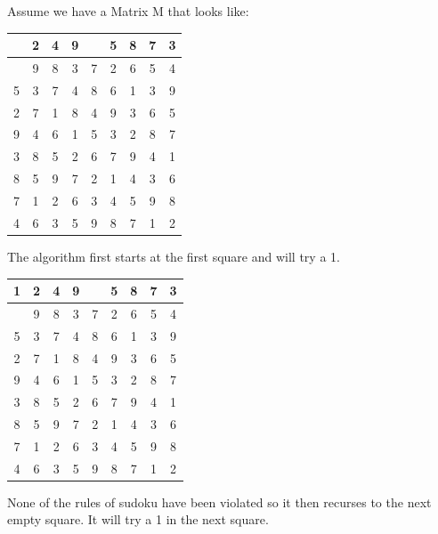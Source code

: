 \documentclass{sig-alternate}
\begin{document}
Assume we have a Matrix M that looks like:

\begin{center}
  \begin{tabular}{ | c | c | c | c | c | c | c | c | c |}
    \hline
      & 2 & 4 & 9 &  & 5 & 8 & 7 & 3 \\ \hline
	  & 9 & 8 & 3 & 7 & 2 & 6 & 5 & 4 \\ \hline
	 5 & 3 & 7 & 4 & 8 & 6 & 1 & 3 & 9\\ \hline
	 2 & 7 & 1 & 8 & 4 & 9 & 3 & 6 & 5\\ \hline
	 9 & 4 & 6 & 1 & 5 & 3 & 2 & 8 & 7\\ \hline
	 3 & 8 & 5 & 2 & 6 & 7 & 9 & 4 & 1\\ \hline
     8 & 5 & 9 & 7 & 2 & 1 & 4 & 3 & 6\\ \hline
	 7 & 1 & 2 & 6 & 3 & 4 & 5 & 9 & 8\\ \hline
	 4 & 6 & 3 & 5 & 9 & 8 & 7 & 1 & 2\\ \hline
  \end{tabular}
\end{center}

The algorithm first starts at the first square and will try a 1. 

\begin{center}
  \begin{tabular}{ | c | c | c | c | c | c | c | c | c |}
    \hline
      \textbf{1} & 2 & 4 & 9 &  & 5 & 8 & 7 & 3 \\ \hline
	  & 9 & 8 & 3 & 7 & 2 & 6 & 5 & 4 \\ \hline
	 5 & 3 & 7 & 4 & 8 & 6 & 1 & 3 & 9\\ \hline
	 2 & 7 & 1 & 8 & 4 & 9 & 3 & 6 & 5\\ \hline
	 9 & 4 & 6 & 1 & 5 & 3 & 2 & 8 & 7\\ \hline
	 3 & 8 & 5 & 2 & 6 & 7 & 9 & 4 & 1\\ \hline
     8 & 5 & 9 & 7 & 2 & 1 & 4 & 3 & 6\\ \hline
	 7 & 1 & 2 & 6 & 3 & 4 & 5 & 9 & 8\\ \hline
	 4 & 6 & 3 & 5 & 9 & 8 & 7 & 1 & 2\\ \hline
  \end{tabular}
\end{center}

None of the rules of sudoku have been violated so it then recurses to the next empty square. It will try a 1 in the next square. 
\end{document}
